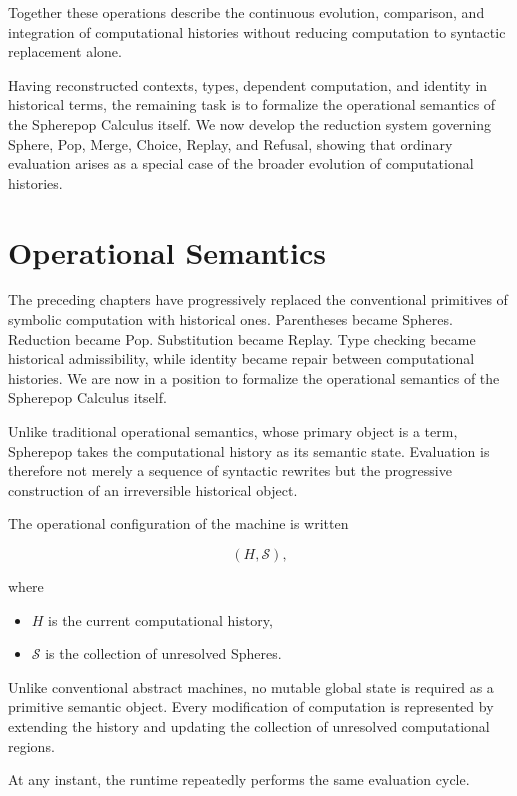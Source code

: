 \documentclass[12pt,oneside]{article}
\theoremstyle{definition}
\theoremstyle{remark}
\begin{document}
Together these operations describe the continuous evolution, comparison, and
integration of computational histories without reducing computation to
syntactic replacement alone.

Having reconstructed contexts, types, dependent computation, and identity in
historical terms, the remaining task is to formalize the operational semantics
of the Spherepop Calculus itself. We now develop the reduction system governing
Sphere, Pop, Merge, Choice, Replay, and Refusal, showing that ordinary
evaluation arises as a special case of the broader evolution of computational
histories.

\section{Operational Semantics}

The preceding chapters have progressively replaced the conventional primitives
of symbolic computation with historical ones. Parentheses became Spheres.
Reduction became Pop. Substitution became Replay. Type checking became
historical admissibility, while identity became repair between computational
histories. We are now in a position to formalize the operational semantics of
the Spherepop Calculus itself.

Unlike traditional operational semantics, whose primary object is a term,
Spherepop takes the computational history as its semantic state. Evaluation is
therefore not merely a sequence of syntactic rewrites but the progressive
construction of an irreversible historical object.

The operational configuration of the machine is written

\[
(H,\mathcal{S}),
\]

where

\begin{itemize}
\item \(H\) is the current computational history,
\item \(\mathcal{S}\) is the collection of unresolved Spheres.
\end{itemize}

Unlike conventional abstract machines, no mutable global state is required as
a primitive semantic object. Every modification of computation is represented
by extending the history and updating the collection of unresolved
computational regions.

At any instant, the runtime repeatedly performs the same evaluation cycle.
\end{document}
